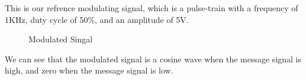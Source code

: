 \documentclass[12pt]{article}
\begin{document}
This is our refrence modulating signal, which is a pulse-train with a frequency of 1KHz, duty cycle of 50\%, and an amplitude of 5V.
\begin{figure}[H]
    \centering
    \caption{Modulated Singal}
\end{figure}
We can see that the modulated signal is a cosine wave when the message signal is high, and zero when the message signal is low.
\end{document}
